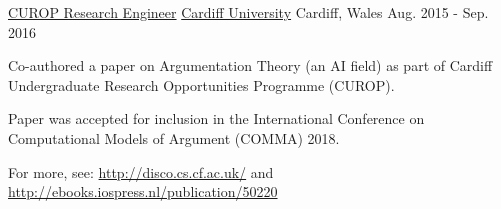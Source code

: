 \begin{cventries}
  \cventry
    {\href{https://www.cardiff.ac.uk/study/undergraduate/why-study-with-us/leaders-in-research/research-opportunities}{CUROP Research Engineer}}
    {\href{https://www.cardiff.ac.uk/}{Cardiff University}}
    {Cardiff, Wales}
    {Aug. 2015 - Sep. 2016}
    {
      \begin{cvitems}
        \item Co-authored a paper on Argumentation Theory (an AI field) as part of Cardiff Undergraduate Research Opportunities Programme (CUROP).
        \item Paper was accepted for inclusion in the International Conference on Computational Models of Argument (COMMA) 2018.
        \item For more, see: \url{http://disco.cs.cf.ac.uk/} and \url{http://ebooks.iospress.nl/publication/50220}
      \end{cvitems}
    }
    {}
\end{cventries}
